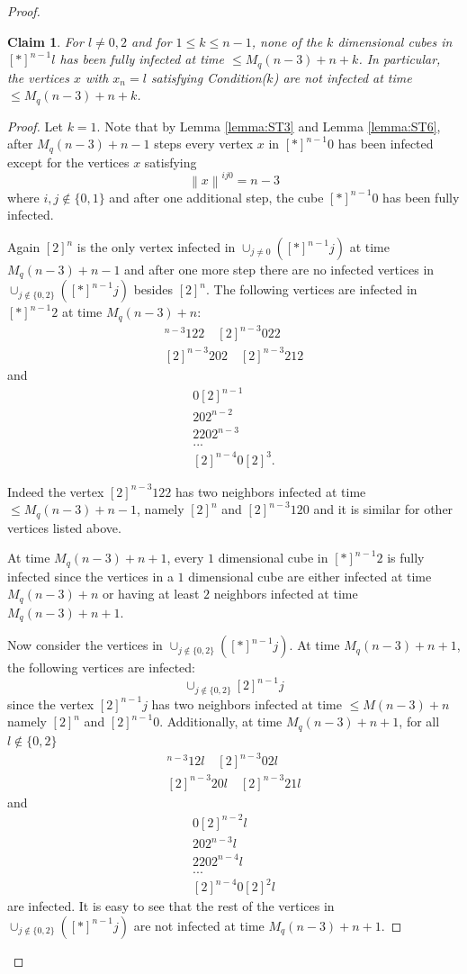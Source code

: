 \documentclass[reqno,11pt]{amsart}
\newtheorem{claim}[theorem]{Claim}
\renewcommand{\leq}{\leqslant}
\begin{document}
\begin{proof}
\begin{claim}
    
    For $l \neq 0,2$ and  for $ 1 \leq k \leq n-1$, none of the $k$ dimensional cubes in $[\ast]^{n-1}l$ has been fully infected at time $ \leq M_q(n-3)+n+k$. In particular, the vertices $x$ with $x_n=l$ satisfying Condition($k$) are not infected at time $ \leq M_q(n-3)+n+k$.
    
\end{claim} 
\begin{proof}
Let $k=1$. Note that by Lemma \ref{lemma:ST3} and Lemma \ref{lemma:ST6}, after $M_q(n-3)+n-1$ steps every vertex $x$ in $[\ast]^{n-1}0$ has been infected except for the vertices $x$ satisfying 
$$\left \lVert x \right \rVert^{ij0}= n-3$$
where $i,j \notin \{0,1\}$
and after one additional step, the cube $[\ast]^{n-1}0$ has been fully infected. 

Again $[2]^n$ is the only vertex infected in $\cup_{j \neq 0} ([\ast]^{n-1}j)$ at time $M_q(n-3)+n-1$ and after one more step there are no infected vertices in $\cup_{j \notin \{0,2\}} ([\ast]^{n-1}j)$ besides $[2]^n$. The following vertices are infected in $[\ast]^{n-1}2$ at time $M_{q}(n-3)+n$:
  \begin{gather*}
 [2]^{n-3}122 \quad [2]^{n-3}022\\
[2]^{n-3}202 \quad [2]^{n-3}212
   \end{gather*}
and 
\begin{gather*}
0[2]^{n-1}\\
202^{n-2}\\
2202^{n-3}\\
...\\
[2]^{n-4}0[2]^3.
\end{gather*}

Indeed the vertex $[2]^{n-3}122$ has two neighbors infected at time $ \leq M_q(n-3)+n-1$, namely $[2]^n$ and $[2]^{n-3}120$ and it is similar for other vertices listed above. 


At time $M_q(n-3)+n+1$, every $1$ dimensional cube in $[\ast]^{n-1}2$ is fully infected since the vertices in a $1$ dimensional cube are either infected at time $M_q(n-3)+n$ or having at least $2$ neighbors infected at time $M_q(n-3)+n+1$. 

Now consider the vertices in $\cup_{j \notin \{0,2\}} ([\ast]^{n-1}j)$. At time $M_q(n-3)+n+1$, the following vertices are infected:
$$\cup_{j \notin \{0,2\}}[2]^{n-1}j$$
since the vertex $[2]^{n-1}j$ has two neighbors infected at time $\leq M(n-3)+n$ namely $[2]^n$ and $[2]^{n-1}0$. Additionally, at time $M_q(n-3)+n+1$, for all $l \notin \{0,2\}$
  \begin{gather*}
 [2]^{n-3}12l \quad [2]^{n-3}02l\\
[2]^{n-3}20l \quad [2]^{n-3}21l
   \end{gather*}
and 
\begin{gather*}
0[2]^{n-2}l\\
202^{n-3}l\\
2202^{n-4}l\\
...\\
[2]^{n-4}0[2]^2l
\end{gather*}
are infected. It is easy to see that the rest of the vertices in $\cup_{j \notin \{0,2\}} ([\ast]^{n-1}j)$ are not infected at time $M_{q}(n-3)+n+1$.


\end{proof}
\end{proof}
\end{document}
